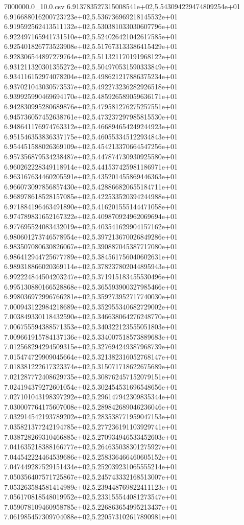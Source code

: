 \begin{filecontents*}{7000000.0_10.0.csv}
6.913783527315008541e+02,5.543094229474809254e+01
6.916688016200723723e+02,5.536736969218145532e+01
6.919592562413511132e+02,5.530381033030607796e+01
6.922497165941731510e+02,5.524026421042617585e+01
6.925401826773523908e+02,5.517673133386415429e+01
6.928306544897279764e+02,5.511321170191968122e+01
6.931211320301355272e+02,5.504970531590333849e+01
6.934116152974078204e+02,5.498621217886375234e+01
6.937021043030573537e+02,5.492273236282926518e+01
6.939925990469694170e+02,5.485926589059636171e+01
6.942830995280689876e+02,5.479581276275257551e+01
6.945736057452638761e+02,5.473237297985815530e+01
6.948641176974763312e+02,5.466894654249244923e+01
6.951546353836337175e+02,5.460553345122934843e+01
6.954451588026369109e+02,5.454213370664547256e+01
6.957356879534238487e+02,5.447874730930925580e+01
6.960262228349118914e+02,5.441537425981186971e+01
6.963167634460205591e+02,5.435201455869446363e+01
6.966073097856857430e+02,5.428866820655184711e+01
6.968978618528157085e+02,5.422533520394244988e+01
6.971884196463491890e+02,5.416201555144471058e+01
6.974789831652167322e+02,5.409870924962069694e+01
6.977695524083432019e+02,5.403541629904157162e+01
6.980601273746578954e+02,5.397213670026849286e+01
6.983507080630826067e+02,5.390887045387717080e+01
6.986412944725677789e+02,5.384561756040602631e+01
6.989318866020369114e+02,5.378237802044895943e+01
6.992224844504203247e+02,5.371915183455530496e+01
6.995130880166528868e+02,5.365593900327985466e+01
6.998036972996766281e+02,5.359273952717740030e+01
7.000943122984218689e+02,5.352955340682729002e+01
7.003849330118432590e+02,5.346638064276248770e+01
7.006755594388571353e+02,5.340322123555051803e+01
7.009661915784137136e+02,5.334007518573889683e+01
7.012568294294509315e+02,5.327694249387968739e+01
7.015474729909045664e+02,5.321382316052768147e+01
7.018381222617323374e+02,5.315071718622675689e+01
7.021287772408629735e+02,5.308762457152079151e+01
7.024194379272601054e+02,5.302454531696548656e+01
7.027101043198397292e+02,5.296147942309835344e+01
7.030007764175607008e+02,5.289842689046236046e+01
7.032914542193789202e+02,5.283538771959047153e+01
7.035821377242194785e+02,5.277236191103929741e+01
7.038728269310466885e+02,5.270934946533452603e+01
7.041635218388166777e+02,5.264635038301275927e+01
7.044542224464539686e+02,5.258336466460605152e+01
7.047449287529151434e+02,5.252039231065555214e+01
7.050356407571725867e+02,5.245743332168513007e+01
7.053263584581414989e+02,5.239448769822411123e+01
7.056170818548019952e+02,5.233155544081273547e+01
7.059078109460958785e+02,5.226863654995213437e+01
7.061985457309704088e+02,5.220573102617890981e+01

\end{filecontents*}
